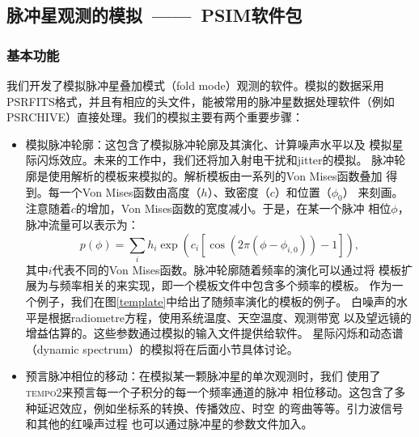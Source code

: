 \subsection{脉冲星观测的模拟\ ——\ PSIM软件包}

\subsubsection{基本功能}

我们开发了模拟脉冲星叠加模式（fold mode）观测的软件。模拟的数据采用
PSRFITS格式，并且有相应的头文件，能被常用的脉冲星数据处理软件（例如
\textsc{PSRCHIVE}）直接处理。我们的模拟主要有两个重要步骤：
\begin{itemize}
\item 模拟脉冲轮廓：这包含了模拟脉冲轮廓及其演化、计算噪声水平以及
模拟星际闪烁效应。未来的工作中，我们还将加入射电干扰和jitter的模拟。
%
脉冲轮廓是使用解析的模板来模拟的。解析模板由一系列的Von Mises函数叠加
得到。每一个Von Mises函数由高度（$h$）、致密度（$c$）和位置（$\phi_0$）
来刻画。注意随着$c$的增加，Von Mises函数的宽度减小。于是，在某一个脉冲
相位$\phi$，脉冲流量可以表示为：
\begin{equation}
p(\phi)=\sum_{i} h_{i}\exp(c_{i}[\cos(2\pi(\phi-\phi_{i,0}))-1]),
\end{equation}
其中$i$代表不同的Von Mises函数。脉冲轮廓随着频率的演化可以通过将
模板扩展为与频率相关的来实现，即一个模板文件中包含多个频率的模板。
作为一个例子，我们在图\ref{template}中给出了随频率演化的模板的例子。
%
白噪声的水平是根据radiometre方程，使用系统温度、天空温度、观测带宽
以及望远镜的增益估算的。这些参数通过模拟的输入文件提供给软件。
星际闪烁和动态谱（dynamic spectrum）的模拟将在后面小节具体讨论。
\item 预言脉冲相位的移动：在模拟某一颗脉冲星的单次观测时，我们
使用了\textsc{tempo2}来预言每一个子积分的每一个频率通道的脉冲
相位移动。这包含了多种延迟效应，例如坐标系的转换、传播效应、时空
的弯曲等等\supercite{Edwards06}。引力波信号和其他的红噪声过程
也可以通过脉冲星的参数文件加入。
\end{itemize}


